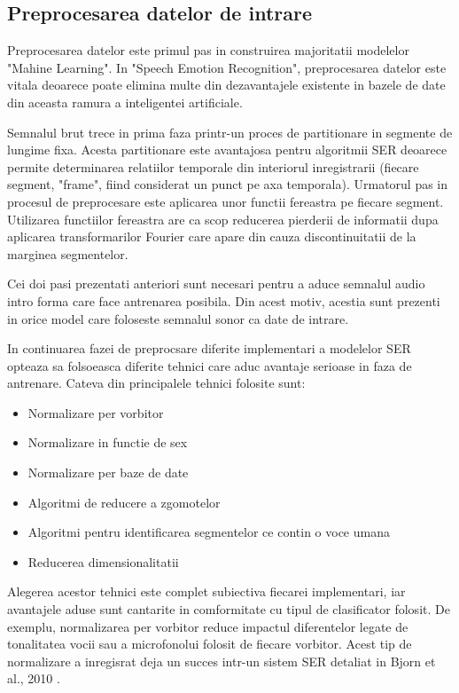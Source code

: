 \documentclass[a4paper,12pt]{book}
\begin{document}
					\subsection{Preprocesarea datelor de intrare}
						Preprocesarea datelor este primul pas in construirea majoritatii modelelor "Mahine Learning". In "Speech Emotion Recognition", preprocesarea datelor este vitala deoarece poate elimina multe din dezavantajele existente in bazele de date din aceasta ramura a inteligentei artificiale.\par
						Semnalul brut trece in prima faza printr-un proces de partitionare in segmente de lungime fixa. Acesta partitionare este avantajosa pentru algoritmii SER deoarece permite determinarea relatiilor temporale din interiorul inregistrarii (fiecare segment, "frame", fiind considerat un punct pe axa temporala). Urmatorul pas in procesul de preprocesare este aplicarea unor functii fereastra pe fiecare segment. Utilizarea functiilor fereastra are ca scop reducerea pierderii de informatii dupa aplicarea transformarilor Fourier care apare din cauza discontinuitatii de la marginea segmentelor. \par
						Cei doi pasi prezentati anteriori sunt necesari pentru a aduce semnalul audio intro forma care face antrenarea posibila. Din acest motiv, acestia sunt prezenti in orice model care foloseste semnalul sonor ca date de intrare. \par
						In continuarea fazei de preprocsare diferite implementari a modelelor SER opteaza sa folsoeasca diferite tehnici care aduc avantaje serioase in faza de antrenare. Cateva din principalele tehnici folosite sunt:
						\begin{itemize}
							\setlength\itemsep{0pt}
							\setlength{\itemindent}{1.5cm}
							\item Normalizare per vorbitor
							\item Normalizare in functie de sex
							\item Normalizare per baze de date
							\item Algoritmi de reducere a zgomotelor
							\item Algoritmi pentru identificarea segmentelor ce contin o voce umana
							\item Reducerea dimensionalitatii
						\end{itemize}
						Alegerea acestor tehnici este complet subiectiva fiecarei implementari, iar avantajele aduse sunt cantarite in comformitate cu tipul de clasificator folosit. De exemplu, normalizarea per vorbitor reduce impactul diferentelor legate de tonalitatea vocii sau a microfonolui folosit de fiecare vorbitor. Acest tip de normalizare a inregisrat deja un succes intr-un sistem SER detaliat in Bjorn et al., 2010 \cite{spnorm}.
\end{document}
